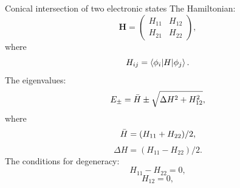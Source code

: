 \documentclass{beamer}
\newcommand\Fontvi{\fontsize{8}{7.2}\selectfont} %
\begin{document}
\begin{frame}{Conical intersection of two electronic states}
    \Fontvi
    The Hamiltonian:
    \begin{equation}
        \mathbf{H} = 
        \begin{pmatrix}
            H_{11} & H_{12} \\
            H_{21} & H_{22}
        \end{pmatrix},
        \label{eq:conintmat}
    \end{equation}
    where 
    \begin{equation}
        H_{ij} = \braket{\phi_i|H|\phi_j}.
    \end{equation}
    The eigenvalues:
    \begin{equation}
        E_{\pm} = \Bar{H} \pm \sqrt{\Delta H^2 + H_{12}^2},
    \end{equation}
    where
    \begin{equation}
        \Bar{H} = (H_{11} + H_{22})/2,
    \end{equation}
    \begin{equation}
        \Delta H = (H_{11} - H_{22})/2.
    \end{equation}
    The conditions for degeneracy:
    \begin{equation}
        H_{11} - H_{22} = 0,
    \end{equation}
    \begin{equation}
        H_{12} = 0,
    \end{equation}
\end{frame}

%
\end{document}
